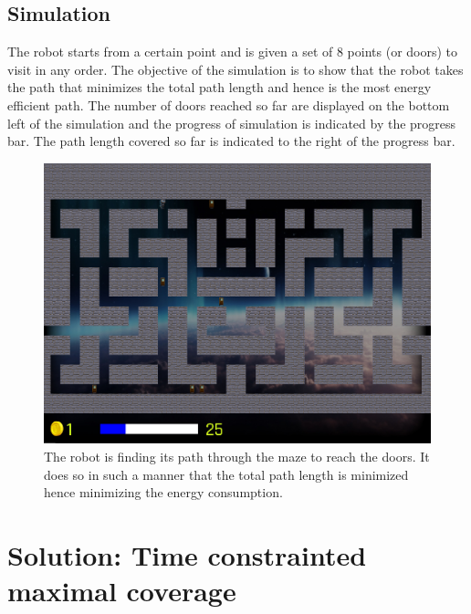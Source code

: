 \documentclass{article}
\begin{document}
\subsection{Simulation}
The robot starts from a certain point and is given  a set of 8 points (or doors) to visit in any order. The objective of the simulation is to show that the robot takes the path that minimizes the
total path length and hence is the most energy efficient path. The number of doors reached so far are displayed on the bottom left of the simulation and the progress of simulation is indicated by the progress bar.
The path length covered so far is indicated to the right of the progress bar. 
\begin{figure}[h!]
    \centering
    \includegraphics[width=\textwidth]{../sim.png}
    \caption{The robot is finding its path through the maze to reach the doors. It does so in such a manner that the total path length is minimized hence minimizing the energy consumption.}
\end{figure}


\newpage
\section{Solution: Time constrainted maximal coverage}
\end{document}
